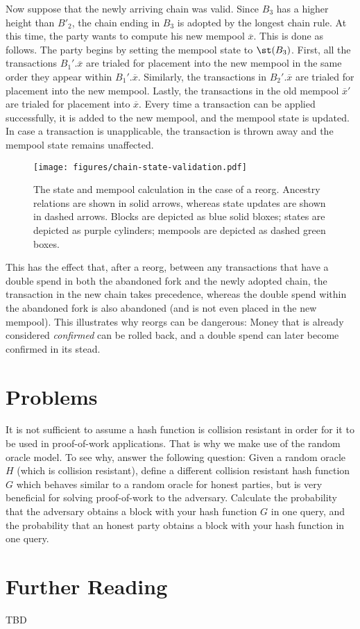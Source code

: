 Now suppose that the newly arriving chain was valid. Since $B_3$ has a higher height than $B'_2$,
the chain ending in
$B_3$ is adopted by the longest chain rule.
At this time, the party wants to compute his new mempool $\overline{x}$.
This is done as follows. The party begins by setting the mempool state to $\st(B_3)$.
First, all the transactions $B_1'.\overline{x}$ are trialed for placement into the new
mempool in the same order they appear within $B_1'.\overline{x}$. Similarly, the
transactions in $B_2'.\overline{x}$ are trialed for placement into the new mempool.
Lastly, the transactions in the old mempool $\overline{x}'$ are trialed for placement
into $\overline{x}$. Every time a transaction can be applied successfully, it is
added to the new mempool, and the mempool state is updated. In case a transaction
is unapplicable, the transaction is thrown away and the mempool state remains unaffected.

\begin{figure}[h]
    \centering
    \texttt{[image: figures/chain-state-validation.pdf]}
    \caption{The state and mempool calculation in the case of a reorg. Ancestry relations
             are shown in solid arrows, whereas state updates are shown in dashed arrows.
             Blocks are depicted as blue solid bloxes; states are depicted as purple cylinders;
             mempools are depicted as dashed green boxes.}
    \label{fig.chain-state-validation}
\end{figure}

This has the effect that, after a reorg, between any transactions that have a double spend in both
the abandoned fork and the newly adopted chain, the transaction in the new
chain takes precedence, whereas the double spend within the abandoned fork is also abandoned
(and is not even placed in the new mempool). This illustrates why reorgs can be dangerous:
Money that is already considered \emph{confirmed} can be rolled back, and a double spend can later
become confirmed in its stead.


\section*{Problems}

\begin{problems}
  \item It is not sufficient to assume a hash function is collision resistant in order
  for it to be used in proof-of-work applications. That is why we make use of
  the random oracle model. To see why, answer the following question:
  Given a random oracle $H$ (which is collision resistant), define a different
  collision resistant hash function $G$ which behaves similar to a random oracle
  for honest parties, but is very beneficial for solving proof-of-work
  to the adversary. Calculate the probability that the adversary obtains a
  block with your hash function $G$ in one query, and the probability that
  an honest party obtains a block with your hash function in one query.
\end{problems}

\section*{Further Reading}

TBD
